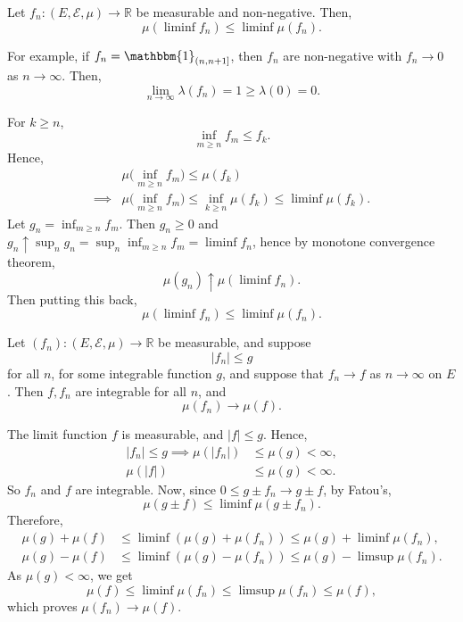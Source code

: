 \documentclass[12pt]{article}
\begin{document}

\begin{lemma}
	Let $f_n : (E, \mathcal{E}, \mu) \to \mathbb{R}$ be measurable and non-negative. Then,
	\[
	\mu(\liminf f_n) \leq \liminf \mu(f_n).
	\]
\end{lemma}

For example, if $f_n = \mathbbm{1}_{(n,n+1]}$, then $f_n$ are non-negative with $f_n \to 0$ as $n \to \infty$. Then,
\[
\lim_{n \to \infty} \lambda(f_n) = 1 \geq \lambda(0) = 0.
\]

\begin{proofbox}
	For $k \geq n$,
	\[
	\inf_{m \geq n} f_m \leq f_k.
	\]
	Hence,
	\begin{align*}
		&\mu\biggl( \inf_{m \geq n} f_m \biggr) \leq \mu(f_k) \\
		\implies &\mu \biggl(\inf_{m \geq n} f_m \biggr) \leq \inf_{k \ge n} \mu(f_k) \leq \liminf \mu(f_k).
	\end{align*}
	Let $g_n = \inf_{m \geq n} f_m$. Then $g_n \geq 0$ and $g_n \uparrow \sup_n g_n = \sup_n \inf_{m \geq n} f_m = \liminf f_n $, hence by monotone convergence theorem,
	\[
	\mu(g_n) \uparrow \mu(\liminf f_n).
	\]
	Then putting this back,
	\[
	\mu(\liminf f_n) \leq \liminf \mu(f_n).
	\]
\end{proofbox}

\begin{theorem}
	Let $(f_n) : (E, \mathcal{E}, \mu) \to \mathbb{R}$ be measurable, and suppose
	\[
	|f_n| \leq g
	\]
	for all $n$, for some integrable function $g$, and suppose that $f_n \to f$ as $n \to \infty$ on $E$. Then $f, f_n$ are integrable for all $n$, and
	\[
	\mu(f_n) \to \mu(f).
	\]
\end{theorem}

\begin{proofbox}
	The limit function $f$ is measurable, and $|f| \leq g$. Hence,
	\begin{align*}
		|f_n| \leq g \implies \mu(|f_n|) & \leq \mu(g) < \infty, \\
		\mu(|f|) &\leq \mu(g) < \infty.
	\end{align*}
	So $f_n$ and $f$ are integrable. Now, since $0 \leq g \pm f_n \to g \pm f$, by Fatou's,
	\[
	\mu(g \pm f) \leq \liminf \mu(g \pm f_n).
	\]
	Therefore,
	\begin{align*}
		\mu(g) + \mu(f) &\leq \liminf (\mu(g) + \mu(f_n)) \leq \mu(g) + \liminf \mu(f_n), \\
		\mu(g) - \mu(f) &\leq \liminf(\mu(g) - \mu(f_n)) \leq \mu(g) - \limsup \mu(f_n).
	\end{align*}
	As $\mu(g) < \infty$, we get
	\[
	\mu(f) \leq \liminf \mu(f_n) \leq \limsup \mu(f_n) \leq \mu(f),
	\]
	which proves $\mu(f_n) \to \mu(f)$.
\end{proofbox}
\end{document}
